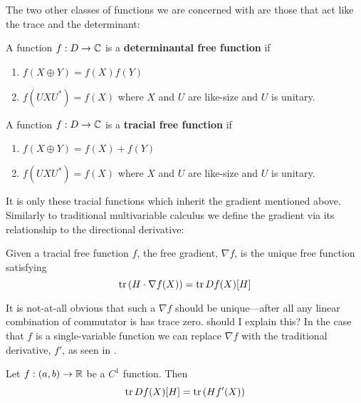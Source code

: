 The two other classes of functions we are concerned with are those that act like
the trace and the determinant:
\begin{definition}
  \label{def:DetFreeFun}
  A function \(f: D \to \mathbb{C} \) is a \textbf{determinantal free function} if
  \begin{enumerate}
    \item \(f(X\oplus Y) = f(X)f(Y)\)
    \item \(f(U X U^*) = f(X)\) where \(X\) and \(U\) are like-size
          and \(U\) is unitary.
  \end{enumerate}
\end{definition}

\begin{definition}
  \label{def:TrFreeFun}
  A function \(f: D \to \mathbb{C} \) is a \textbf{tracial free function} if
  \begin{enumerate}
    \item \(f(X\oplus Y) = f(X)+f(Y)\)
    \item \(f(U X U^*) = f(X)\) where \(X\) and \(U\) are like-size
          and \(U\) is unitary.
  \end{enumerate}
\end{definition}

It is only these tracial functions which inherit the gradient mentioned above.
Similarly to traditional multivariable calculus we define the gradient via its
relationship to the directional derivative:
\begin{definition}
\label{def:FreeGrad}
  Given a tracial free function \(f\), the free gradient, \(\nabla f\), is the
  unique free function satisfying
  \[
    \mathrm{tr} \left( H \cdot \nabla f(X) \right) = \mathrm{tr}\, Df(X)[H]
  \]
\end{definition}

It is not-at-all obvious that such a \(\nabla f \) should be unique---after all
any linear combination of commutator is has trace zero. {\color{red} should I
  explain this?} In the case that \(f\) is a single-variable function we can
replace \(\nabla f\) with the traditional derivative, \(f'\), as seen in
\cite[Thm 3.3]{pascoeTrace2020}.
\begin{theorem}
  Let \(f: (a,b)\to \mathbb{R} \) be a \(C^1\) function. Then
  \[
    \mathrm{tr} \, Df(X)[H] = \mathrm{tr} \left( Hf'(X) \right)
  \]
\end{theorem}

